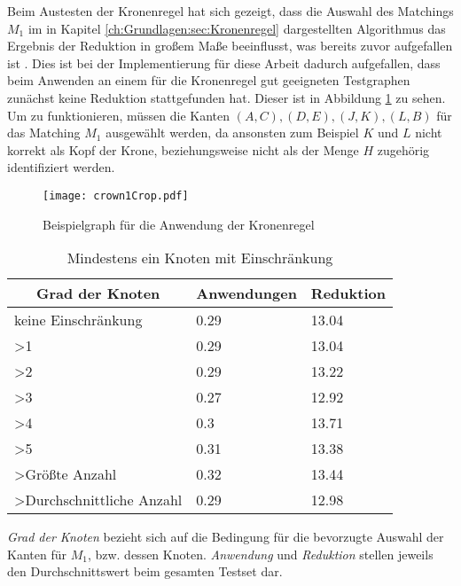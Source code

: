 Beim Austesten der Kronenregel hat sich gezeigt, dass die Auswahl des Matchings $M_{1}$ im in Kapitel \ref{ch:Grundlagen:sec:Kronenregel} dargestellten Algorithmus das Ergebnis der Reduktion in großem Maße beeinflusst, was bereits zuvor aufgefallen ist \cite{paper:7}. Dies ist bei der Implementierung für diese Arbeit dadurch aufgefallen, dass beim Anwenden an einem für die Kronenregel gut geeigneten Testgraphen zunächst keine Reduktion stattgefunden hat. Dieser ist in Abbildung \ref{fig:crown1} zu sehen. Um zu funktionieren, müssen die Kanten $(A,C), (D,E), (J,K), (L,B)$ für das Matching $M_{1}$ ausgewählt werden, da ansonsten zum Beispiel $K$ und $L$ nicht korrekt als Kopf der Krone, beziehungsweise nicht als der Menge $H$ zugehörig identifiziert werden.
\begin{figure}[htb]
\centering
  	{\texttt{[image: crown1Crop.pdf]}}
	\caption{Beispielgraph für die Anwendung der Kronenregel\label{fig:crown1}}
\centering
\end{figure}
\begin{table}[htb]
\caption{Mindestens ein Knoten mit Einschränkung\label{tab:degreeOR}}
\vspace*{1em}
\centering

\bgroup
\def\arraystretch{1.3}%

\begin{threeparttable}

\begin{tabular}[c]{lll}
	\hline
	\multicolumn{1}{c}{\textbf{Grad der Knoten}} & 
	\multicolumn{1}{c}{\textbf{Anwendungen}} & 
	\multicolumn{1}{c}{\textbf{Reduktion}} \\ 
	
	\hline

	keine Einschränkung&0.29&13.04\\
	>1&0.29 &13.04 \\
	>2&0.29 &13.22 \\
	>3& 0.27& 12.92 \\
	>4& 0.3& 13.71 \\
	>5& 0.31&13.38 \\
	>Größte Anzahl& 0.32&13.44 \\
	>Durchschnittliche Anzahl& 0.29&12.98 \\
	\hline
\end{tabular}
\begin{tablenotes}\footnotesize
\item \emph{Grad der Knoten} bezieht sich auf die Bedingung für die bevorzugte Auswahl der Kanten für $M_{1}$, bzw. dessen Knoten. \emph{Anwendung} und \emph{Reduktion} stellen jeweils den Durchschnittswert beim gesamten Testset dar.
\end{tablenotes}

\end{threeparttable}

\egroup

\end{table}

